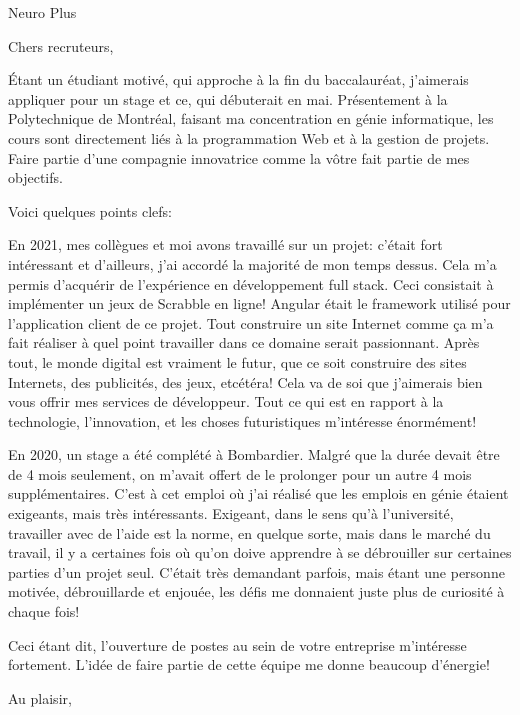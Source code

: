 \documentclass[12pt,french]{letter}
\begin{document}
\pagestyle{headings}

\begin{letter}{Neuro Plus}
\address{Montréal, Canada}

\opening{Chers recruteurs,}


Étant un étudiant motivé, qui approche à la fin du baccalauréat, j’aimerais appliquer pour un stage et ce, qui débuterait en mai.  Présentement à la Polytechnique de Montréal, faisant ma concentration en génie informatique, les cours sont directement liés à la programmation Web et à la gestion de projets.  Faire partie d’une compagnie innovatrice comme la vôtre fait partie de mes objectifs.

Voici quelques points clefs:

En 2021, mes collègues et moi avons travaillé sur un projet: c’était fort intéressant et d’ailleurs, j’ai accordé la majorité de mon temps dessus.  Cela m'a permis d’acquérir de l’expérience en développement full stack.  Ceci consistait à implémenter un jeux de Scrabble en ligne! Angular était le framework utilisé pour l'application client de ce projet.  Tout construire un site Internet comme ça m’a fait réaliser à quel point travailler dans ce domaine serait passionnant.  Après tout, le monde digital est vraiment le futur, que ce soit construire des sites Internets, des publicités, des jeux, etcétéra!  Cela va de soi que j’aimerais bien vous offrir mes services de développeur.  Tout ce qui est en rapport à la technologie, l’innovation, et les choses futuristiques m’intéresse énormément! 

En 2020, un stage a été complété à Bombardier.  Malgré que la durée devait être de 4 mois seulement, on m’avait offert de le prolonger pour un autre 4 mois supplémentaires.  C’est à cet emploi où j’ai réalisé que les emplois en génie étaient exigeants, mais très intéressants. Exigeant, dans le sens qu’à l’université, travailler avec de l'aide est la norme, en quelque sorte, mais dans le marché du travail, il y a certaines fois où qu’on doive apprendre à se débrouiller sur certaines parties d’un projet seul.  C’était très demandant parfois, mais étant une personne motivée, débrouillarde et enjouée, les défis me donnaient juste plus de curiosité à chaque fois!

Ceci étant dit, l'ouverture de postes au sein de votre entreprise m’intéresse fortement.
L’idée de faire partie de cette équipe me donne beaucoup d’énergie!


\signature{Maxime Laroche}

\closing{Au plaisir,}


\end{letter}
\end{document}
